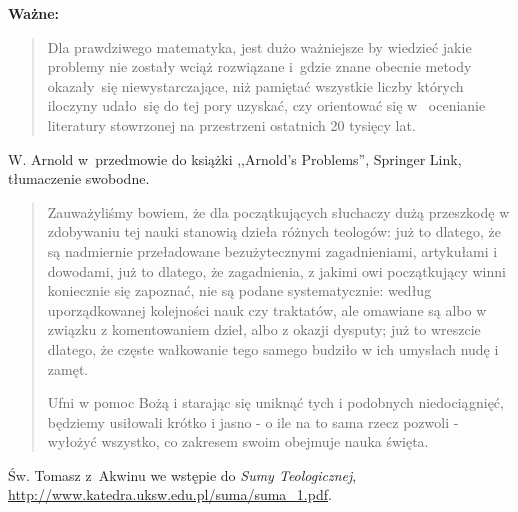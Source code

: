\documentclass[a4paper,11pt]{article}
\begin{document}
\textbf{Ważne:}
\begin{quote}
  Dla prawdziwego matematyka, jest dużo ważniejsze by wiedzieć jakie
  problemy nie zostały wciąż rozwiązane i~gdzie znane obecnie metody
  okazały~się niewystarczające, niż pamiętać wszystkie liczby których
  iloczyny udało~się do tej pory uzyskać, czy orientować się w~
  ocenianie literatury stowrzonej na przestrzeni ostatnich 20 tysięcy
  lat.
\end{quote}
W. Arnold w~przedmowie do książki ,,Arnold's Problems'', Springer Link, tłumaczenie swobodne.\\
\begin{quote}
  Zauważyliśmy bowiem, że dla początkujących słuchaczy dużą przeszkodę
  w zdobywaniu tej nauki stanowią dzieła różnych teologów: już to
  dlatego, że są nadmiernie przeładowane bezużytecznymi zagadnieniami,
  artykułami i dowodami, już to dlatego, że zagadnienia, z jakimi owi
  początkujący winni koniecznie się zapoznać, nie są podane
  systematycznie: według uporządkowanej kolejności nauk czy traktatów,
  ale omawiane są albo w związku z komentowaniem dzieł, albo z okazji
  dysputy; już to wreszcie dlatego, że częste wałkowanie tego samego
  budziło w ich umysłach nudę i zamęt.

  Ufni w pomoc Bożą i starając się uniknąć tych i podobnych
  niedociągnięć, będziemy usiłowali krótko i jasno - o ile na to sama
  rzecz pozwoli - wyłożyć wszystko, co zakresem swoim obejmuje nauka
  święta.
\end{quote}
Św. Tomasz z~Akwinu we wstępie do \emph{Sumy Teologicznej},
\url{http://www.katedra.uksw.edu.pl/suma/suma_1.pdf}.





 {}



\end{document}
